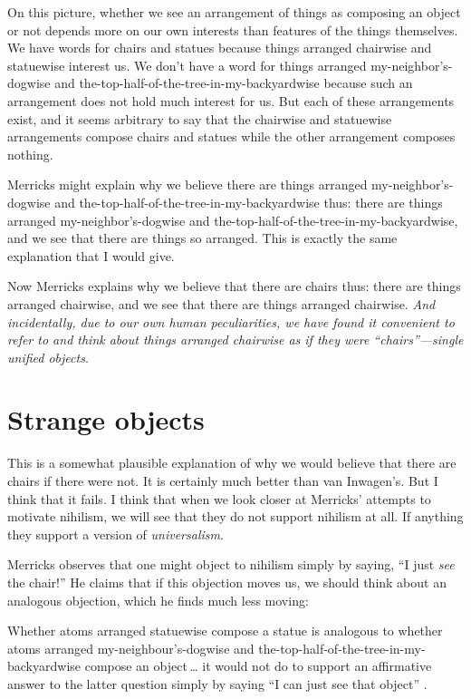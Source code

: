 \documentclass[12pt,twoside]{reedfancy}
\newenvironment{squote}{%
	\begin{spacing}{1}
	\begin{list}{}{%
	\setlength{\labelwidth}{0pt}%
	\rightmargin\leftmargin%
	}
	\item\relax
	}{%
	\end{list}%
	\end{spacing}
	}
\begin{document}
\begin{spacing}{1.25}
On this picture, whether we see an arrangement of things as composing
an object or not depends more on our own interests than features of
the things themselves.  We have words for chairs and statues because
things arranged chairwise and statuewise interest us.  We don't have a
word for things arranged my-neighbor's-dogwise and
the-top-half-of-the-tree-in-my-backyardwise because such an
arrangement does not hold much interest for us.  But each of these
arrangements exist, and it seems arbitrary to say that the chairwise
and statuewise arrangements compose chairs and statues while the other
arrangement composes nothing.

Merricks might explain why we believe there are things arranged
my-neighbor's-dogwise and the-top-half-of-the-tree-in-my-backyardwise
thus: there are things arranged my-neighbor's-dogwise and
the-top-half-of-the-tree-in-my-backyardwise, and we see that there are
things so arranged.  This is exactly the same explanation that I would
give.

Now Merricks explains why we believe that there are chairs thus: there
are things arranged chairwise, and we see that there are things
arranged chairwise.  {\em And incidentally, due to our own human
  peculiarities, we have found it convenient to refer to and think
  about things arranged chairwise as if they were ``chairs''---single
  unified objects}.

\section{Strange objects}
\label{dogbush}
This is a somewhat plausible explanation of why we would believe that
there are chairs if there were not.  It is certainly much better than
van Inwagen's.  But I think that it fails.  I think that when we look
closer at Merricks' attempts to motivate nihilism, we will see that
they do not support nihilism at all.  If anything they support a
version of {\em universalism}.

Merricks observes that one might object to nihilism simply by saying,
``I just {\em see} the chair!''  He claims that if this objection
moves us, we should think about an analogous objection, which he finds
much less moving:

\begin{squote}
Whether atoms arranged statuewise compose a statue is analogous to
whether atoms arranged my-neighbour's-dogwise and
the-top-half-of-the-tree-in-my-backyardwise compose an object\,\ldots
it would not do to support an affirmative answer to the latter
question simply by saying ``I can just see that object''
\citeyearpar[73]{merricks2001a}.
\end{squote}


\end{spacing}
\end{document}

